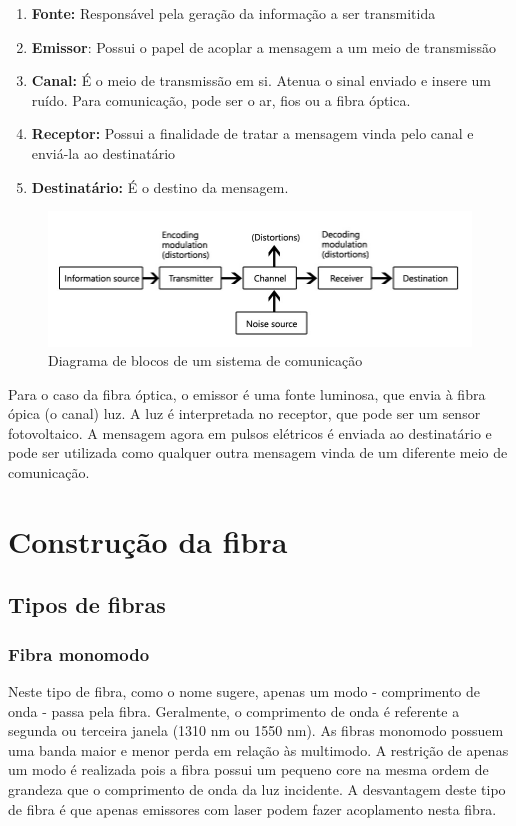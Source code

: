 \documentclass[article]{IEEEtran}
\begin{document}
\begin{enumerate}
\item \textbf{Fonte:} Responsável pela geração da informação a ser transmitida
\item \textbf{Emissor}: Possui o papel de acoplar a mensagem a um meio de transmissão
\item \textbf{Canal:} É o meio de transmissão em si. Atenua o sinal enviado e insere um ruído. Para comunicação, pode ser o ar, fios ou a fibra óptica.
\item \textbf{Receptor:} Possui a finalidade de tratar a mensagem vinda pelo canal e enviá-la ao destinatário
\item \textbf{Destinatário:} É o destino da mensagem.
\end{enumerate}

\begin{figure}[h]
\label{fig:diagrama-sistema-comunicacao}
\includegraphics[width=\columnwidth]{communication-system.jpg}
\caption{Diagrama de blocos de um sistema de comunicação}
\end{figure}

Para o caso da fibra óptica, o emissor é uma fonte luminosa, que envia à fibra ópica (o canal) luz. A luz é interpretada no receptor, que pode ser um sensor fotovoltaico. A mensagem agora em pulsos elétricos é enviada ao destinatário e pode ser utilizada como qualquer outra mensagem vinda de um diferente meio de comunicação.
\section{Construção da fibra}


\subsection{Tipos de fibras}

\subsubsection{Fibra monomodo}
Neste tipo de fibra, como o nome sugere, apenas um modo - comprimento de onda - passa pela fibra. Geralmente, o comprimento de onda é referente a segunda ou terceira janela (1310 nm ou 1550 nm). As fibras monomodo possuem uma banda maior e menor perda em relação às multimodo. A restrição de apenas um modo é realizada pois a fibra possui um pequeno core na mesma ordem de grandeza que o comprimento de onda da luz incidente. A desvantagem deste tipo de fibra é que apenas emissores com laser podem fazer acoplamento nesta fibra.
\end{document}
